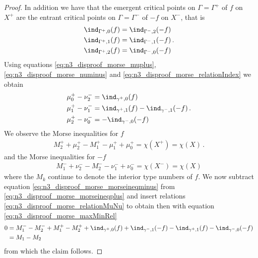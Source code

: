 \begin{proof}
  In addition we have that the emergent critical points on $\Gamma=\Gamma^+$ of $f$ on $X^+$ are the
  entrant critical points on $\Gamma=\Gamma^-$ of $-f$ on $X^-$, that is
  \begin{equation}
    \begin{aligned}
      \ind_{\Gamma^+,0}(f)&=\ind_{\Gamma^-,2}(-f) \\
      \ind_{\Gamma^+,1}(f)&=\ind_{\Gamma^-,1}(-f) \\
      \ind_{\Gamma^+,2}(f)&=\ind_{\Gamma^-,0}(-f)\label{eq:n3_disproof_morse_relationIndex} 
    \end{aligned}\,.
  \end{equation}
  Using equations \eqref{eq:n3_disproof_morse_muplus}, \eqref{eq:n3_disproof_morse_numinus} and \eqref{eq:n3_disproof_morse_relationIndex}
  we obtain
  \begin{equation}
    \begin{aligned}
      \mu^+_0-\nu^-_2&=\ind_{\gamma^+,0}(f) \\
      \mu^+_1-\nu^-_1&=\ind_{\gamma^+,1}(f)-\ind_{\gamma^-,1}(-f) \\
      \mu^+_2-\nu^-_0&=-\ind_{\gamma^-,0}(-f)
    \end{aligned}\,.\label{eq:n3_disproof_morse_relationMuNu}
  \end{equation}
  We observe the Morse inequalities for $f$
  \begin{align}
    M_2^++\mu^+_2-M_1^+-\mu^+_1+\mu^+_0=\chi(X^+)=\chi(X)\,.\label{eq:n3_disproof_morse_morseineqplus}
  \end{align}
  and the Morse inequalities for $-f$
  \begin{align}
    M_1^-+\nu^-_2-M_2^--\nu^-_1+\nu^-_0=\chi(X^-)=\chi(X)\label{eq:n3_disproof_morse_morseineqminus}
  \end{align}
  where the $M_k$ continue to denote the interior type numbers of $f$.
  We now subtract equation \eqref{eq:n3_disproof_morse_morseineqminus} from \eqref{eq:n3_disproof_morse_morseineqplus}
  and insert relations \eqref{eq:n3_disproof_morse_relationMuNu} to obtain
  then with equation \eqref{eq:n3_disproof_morse_maxMinRel}
  \begin{align*}
    0&=M_1^--M_2^-+M_1^+-M_2^++\ind_{\gamma^+,0}(f)+\ind_{\gamma^-,1}(-f)-\ind_{\gamma^+,1}(f)-\ind_{\gamma^-,0}(-f) \\
    &= M_1-M_2
  \end{align*}
  from which the claim follows.



\end{proof}

